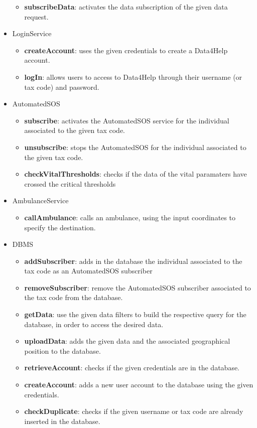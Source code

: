 \begin{itemize}
\begin{itemize}
\item \textbf{subscribeData}: activates the data subscription of the given data request.
\end{itemize}
\item LoginService
\begin{itemize}
\item \textbf{createAccount}: uses the given credentials to create a Data4Help account.
\item \textbf{logIn}: allows users to access to Data4Help through their username (or tax code) and password.
\end{itemize}
\item AutomatedSOS
\begin{itemize}
\item \textbf{subscribe}: activates the AutomatedSOS service for the individual associated to the given tax code.
\item \textbf{unsubscribe}: stops the AutomatedSOS for the individual associated to the given tax code.
\item \textbf{checkVitalThresholds}: checks if the data of the vital paramaters have crossed the critical thresholds
\end{itemize}
\item AmbulanceService
\begin{itemize}
\item \textbf{callAmbulance}: calls an ambulance, using the input coordinates to specify the destination.
\end{itemize}
\item DBMS
\begin{itemize}
\item \textbf{addSubscriber}: adds in the database the individual associated to the tax code as an AutomatedSOS subscriber
\item \textbf{removeSubscriber}: remove the AutomatedSOS subscriber associated to the tax code from the database.
\item \textbf{getData}: use the given data filters to build the respective query for the database, in order to access the desired data.
\item \textbf{uploadData}: adds the given data and the associated geographical position to the database.
\item \textbf{retrieveAccount}: checks if the given credentials are in the database.
\item \textbf{createAccount}: adds a new user account to the database using the given credentials.
\item \textbf{checkDuplicate}: checks if the given username or tax code are already inserted in the database.
\end{itemize}
\end{itemize}



